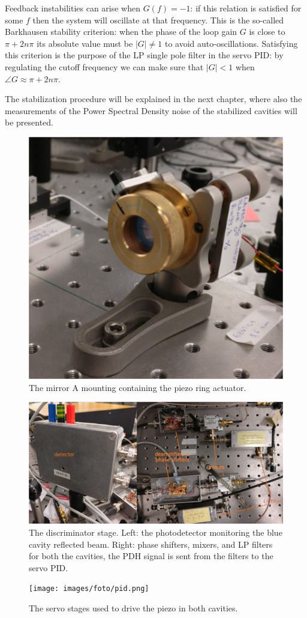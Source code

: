 Feedback instabilities can arise when $G(f)=-1$: if this relation is satisfied for some $f$ then the system will oscillate at that frequency. This is the so-called Barkhausen stability criterion: when the phase of the loop gain $G$ is close to $\pi +2n\pi$ its absolute value must be $|G|\ne1$ to avoid auto-oscillations. Satisfying this criterion is the purpose of the LP single pole filter in the servo PID: by regulating the cutoff frequency we can make sure that $|G|<1 $ when $\angle G \approx \pi +2n\pi$.

The stabilization procedure will be explained in the next chapter, where also the  measurements of the Power Spectral Density noise of the stabilized cavities will be presented.

\begin{figure}
	\centering
	\includegraphics[width=0.7\linewidth]{images/foto/actuator.jpg}
	\caption{The mirror A mounting containing the piezo ring actuator.}
	\label{fig:fotoactu}
\end{figure}
\begin{figure}
	\centering
	\includegraphics[width=0.9\linewidth]{images/foto/discr.jpg}
	\caption{The discriminator stage. Left: the photodetector monitoring the blue cavity reflected beam. Right: phase shifters, mixers, and LP filters for both the cavities, the PDH signal is sent from the filters to the servo PID. }
	\label{fig:discr}
\end{figure}
\begin{figure}
	\centering
	\texttt{[image: images/foto/pid.png]}
	\caption{The servo stages used to drive the piezo in both cavities. }
	\label{fig:pid}
\end{figure}